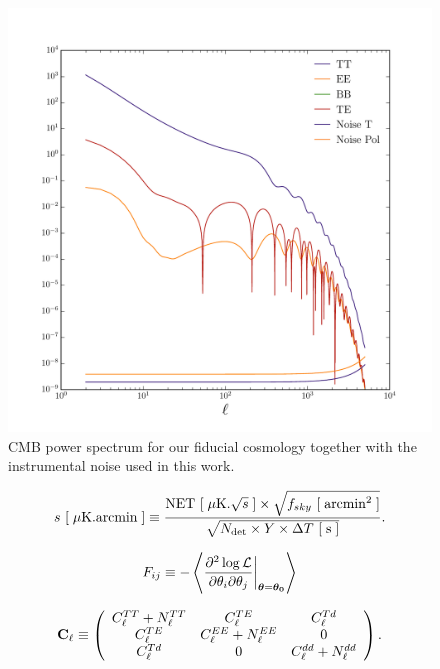 \documentclass[aps,prl,preprint,groupedaddress]{revtex4-1}
\begin{document}
\begin{figure}[htbp]
\begin{center}
\includegraphics[scale=0.6]{PS_with_noise.pdf}
\caption{CMB power spectrum for our fiducial cosmology together with the instrumental noise used in this work.}
\label{fig:cmb-cl-noise}
\end{center}
\end{figure}





\begin{eqnarray}
\centering
	s\ [\;\mu {\rm K.arcmin}\;] \equiv \frac{ {\rm NET}\ [\; \mu{\rm K.}\sqrt{s}\;] \times \sqrt{f_{sky} \ [\;{\rm arcmin}^2\;] }}{ \sqrt {N_{\rm det} \times Y \times \Delta T\ [\;{\rm s }\;]}}.
	\label{eq:sensitivity_definition}
\end{eqnarray}

\begin{equation}
	\centering
		F_{ij} \equiv - \left\langle\frac{\partial^2 \log \mathcal{L}}{\partial \theta_i \partial \theta_j} \bigg|_{\boldsymbol{\theta} = \boldsymbol{\theta_0}}\right\rangle
	\label{eq:Fij_def}
\end{equation}

 \begin{eqnarray}
 	\centering
		\mathbf{C}_\ell \equiv \left( \begin{array}{ccc}C_\ell^{TT} + N_\ell^{TT} & C_\ell^{TE} & C_\ell^{Td} \\ C_\ell^{TE} & C_\ell^{EE} + N_\ell^{EE} & 0 \\ C_\ell^{Td} & 0 & C_\ell^{dd} + N_\ell^{dd}\end{array}\right).
	\label{eq:cov_definition}
\end{eqnarray}
\end{document}
